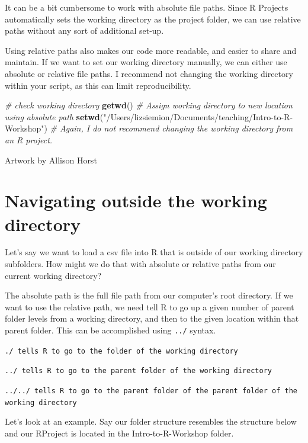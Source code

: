 \documentclass[
]{book}
\newenvironment{Shaded}{\begin{snugshade}}{\end{snugshade}}
\newcommand{\CommentTok}[1]{\textcolor[rgb]{0.56,0.35,0.01}{\textit{#1}}}
\newcommand{\FunctionTok}[1]{\textcolor[rgb]{0.13,0.29,0.53}{\textbf{#1}}}
\newcommand{\NormalTok}[1]{#1}
\newcommand{\StringTok}[1]{\textcolor[rgb]{0.31,0.60,0.02}{#1}}
\begin{document}
It can be a bit cumbersome to work with absolute file paths. Since R Projects automatically sets the working directory as the project folder, we can use relative paths without any sort of additional set-up.

Using relative paths also makes our code more readable, and easier to share and maintain. If we want to set our working directory manually, we can either use absolute or relative file paths. I recommend not changing the working directory within your script, as this can limit reproducibility.

\begin{Shaded}
\begin{Highlighting}[]
\CommentTok{\# check working directory}
\FunctionTok{getwd}\NormalTok{() }
\CommentTok{\# Assign working directory to new location using absolute path}
\FunctionTok{setwd}\NormalTok{(}\StringTok{"/Users/lizsiemion/Documents/teaching/Intro{-}to{-}R{-}Workshop"}\NormalTok{)}
\CommentTok{\# Again, I do not recommend changing the working directory from an R project.}
\end{Highlighting}
\end{Shaded}

Artwork by Allison Horst

\section{Navigating outside the working directory}\label{navigating-outside-the-working-directory}

Let's say we want to load a csv file into R that is outside of our working directory subfolders. How might we do that with absolute or relative paths from our current working directory?

The absolute path is the full file path from our computer's root directory. If we want to use the relative path, we need tell R to go up a given number of parent folder levels from a working directory, and then to the given location within that parent folder. This can be accomplished using \texttt{../} syntax.

\texttt{./\ tells\ R\ to\ go\ to\ the\ folder\ of\ the\ working\ directory}

\texttt{../\ tells\ R\ to\ go\ to\ the\ parent\ folder\ of\ the\ working\ directory}

\texttt{../../\ tells\ R\ to\ go\ to\ the\ parent\ folder\ of\ the\ parent\ folder\ of\ the\ working\ directory}

Let's look at an example. Say our folder structure resembles the structure below and our RProject is located in the Intro-to-R-Workshop folder.
\end{document}
